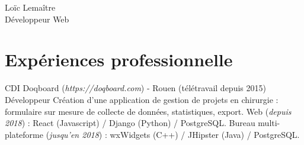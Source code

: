 \documentclass[10pt]{article} %
\begin{document}
\begin{paracol}{2} %


  \parbox[top][0.12\textheight][c]{\linewidth}{ %
    \vspace{-0.04\textheight} %
    \centering %
    {\sffamily\Huge Loïc Lemaître}\\\medskip %
    {\Huge\color{headings}\cvtextfont Développeur Web}
  }


  \section{Expériences professionnelle}





  {CDI} %
  {Doqboard \small{(\textit{https://doqboard.com})} - Rouen \small{(télétravail depuis 2015)}} %
  {Développeur} %
  { Création d'une application de gestion de projets en chirurgie : formulaire sur mesure de collecte de données, statistiques, export. Web \small{(\textit{depuis 2018})} : React (Javascript) / Django (Python) / PostgreSQL. Bureau multi-plateforme \small{(\textit{jusqu'en 2018})} : wxWidgets (C++) / JHipster (Java) / PostgreSQL.
  } %



\end{paracol}
\end{document}
